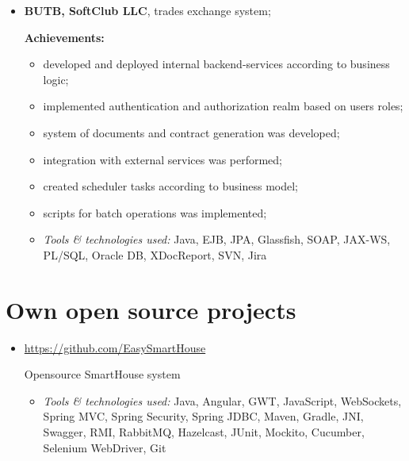 \documentclass[a4paper, 12pt]{article}
\newcommand{\position}[1]{
    \textbf{#1}}
\newcommand{\itemlabel}[1]{
    \textit{#1:}}
\begin{document}
     \begin{itemize}
        \item \position{BUTB, SoftClub LLC}, trades exchange system;

            \textbf{Achievements:}
			\begin{itemize}
  				\item developed and deployed internal backend-services according to business logic;
  				\item implemented authentication and authorization realm based on users roles;
  				\item system of documents and contract generation was developed;
  				\item integration with external services was performed;
  				\item created scheduler tasks according to business model;
  				\item scripts for batch operations was implemented;
			\end{itemize}
	
            \begin{itemize}
                \item \itemlabel{Tools \& technologies used} Java, EJB, JPA, Glassfish, SOAP, JAX-WS, PL/SQL, Oracle DB, XDocReport, SVN, Jira
            \end{itemize}


    \end{itemize}    
    
\section*{Own open source projects}  
   
    \begin{itemize}
        \item \href{https://github.com/EasySmartHouse}{https://github.com/EasySmartHouse}

Opensource SmartHouse system 
                        
            \begin{itemize}
                \item \itemlabel{Tools \& technologies used} Java, Angular, GWT, JavaScript, WebSockets, Spring MVC, Spring Security, Spring JDBC, Maven, Gradle, JNI, Swagger, RMI, RabbitMQ, Hazelcast, JUnit, Mockito, Cucumber, Selenium WebDriver, Git
            \end{itemize}
     \end{itemize}
            
\end{document}
